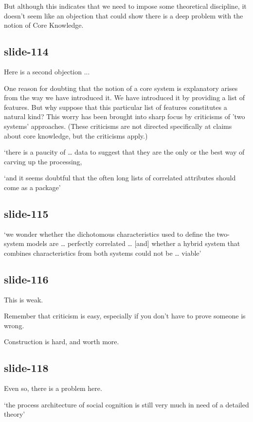 \documentclass[12pt,\papersize]{extarticle}
\begin{document}
But although this indicates that we need to impose some theoretical discipline,
it doesn’t seem like an objection that could show there is a deep problem
with the notion of Core Knowledge.

\subsection{slide-114}
Here is a second objection ...

One reason for doubting that the notion of a core system is explanatory arises from the
way we have introduced it.
We have introduced it by providing a list of features.
But why suppose that this particular list of features constitutes a natural kind?
This worry has been brought into sharp focus by criticisms of 'two systems' approaches.
(These criticisms are not directed specifically at claims about core
knowledge, but the criticisms apply.)

‘there is a paucity of … data to suggest that they are the only or the best way of carving up the processing,

‘and it seems doubtful that the often long lists of correlated attributes should come as a package’
\citep[p.\ 759]{adolphs_conceptual_2010}

\subsection{slide-115}
‘we wonder whether the dichotomous characteristics used to define the two-system
models are … perfectly correlated …
[and] whether a hybrid system that combines characteristics from both
systems could not be … viable’
\citep[p.\ 537]{keren_two_2009}

\subsection{slide-116}
This is weak.

Remember that criticism is easy, especially if you don't have to prove someone is wrong.

Construction is hard, and worth more.

\subsection{slide-118}
Even so, there is a problem here.

‘the process architecture of social cognition is still very much in need of a detailed theory’
\citep[p.\ 759]{adolphs_conceptual_2010}
\end{document}
